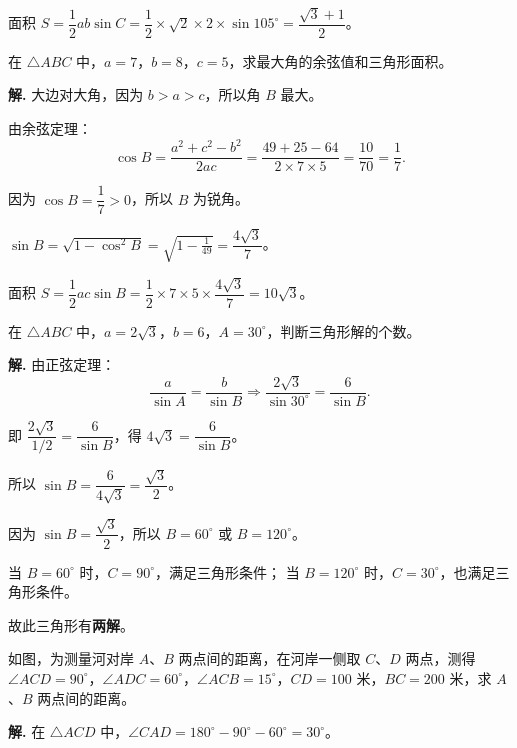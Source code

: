 \documentclass[11pt]{ctexrep}
\begin{document}
面积 $S = \dfrac{1}{2}ab\sin C = \dfrac{1}{2} \times \sqrt{2} \times 2 \times \sin 105^{\circ} = \dfrac{\sqrt{3} + 1}{2}$。

\begin{example}[余弦定理的应用]
    在 $\triangle ABC$ 中，$a = 7$，$b = 8$，$c = 5$，求最大角的余弦值和三角形面积。
\end{example}

\textbf{解.} 大边对大角，因为 $b > a > c$，所以角 $B$ 最大。

由余弦定理：
\[
    \cos B = \frac{a^2 + c^2 - b^2}{2ac} = \frac{49 + 25 - 64}{2 \times 7 \times 5} = \frac{10}{70} = \frac{1}{7}.
\]

因为 $\cos B = \dfrac{1}{7} > 0$，所以 $B$ 为锐角。

$\sin B = \sqrt{1 - \cos^2 B} = \sqrt{1 - \frac{1}{49}} = \dfrac{4\sqrt{3}}{7}$。

面积 $S = \dfrac{1}{2}ac\sin B = \dfrac{1}{2} \times 7 \times 5 \times \dfrac{4\sqrt{3}}{7} = 10\sqrt{3}$。

\begin{example}
    在 $\triangle ABC$ 中，$a = 2\sqrt{3}$，$b = 6$，$A = 30^{\circ}$，判断三角形解的个数。
\end{example}

\textbf{解.} 由正弦定理：
\[
    \frac{a}{\sin A} = \frac{b}{\sin B} \Rightarrow \frac{2\sqrt{3}}{\sin 30^{\circ}} = \frac{6}{\sin B}.
\]

即 $\dfrac{2\sqrt{3}}{1/2} = \dfrac{6}{\sin B}$，得 $4\sqrt{3} = \dfrac{6}{\sin B}$。

所以 $\sin B = \dfrac{6}{4\sqrt{3}} = \dfrac{\sqrt{3}}{2}$。

因为 $\sin B = \dfrac{\sqrt{3}}{2}$，所以 $B = 60^{\circ}$ 或 $B = 120^{\circ}$。

当 $B = 60^{\circ}$ 时，$C = 90^{\circ}$，满足三角形条件；
当 $B = 120^{\circ}$ 时，$C = 30^{\circ}$，也满足三角形条件。

故此三角形有\textbf{两解}。

\begin{realexam}[2026 奉贤高三二模]
    如图，为测量河对岸 $A$、$B$ 两点间的距离，在河岸一侧取 $C$、$D$ 两点，测得 $\angle ACD = 90^{\circ}$，$\angle ADC = 60^{\circ}$，$\angle ACB = 15^{\circ}$，$CD = 100$ 米，$BC = 200$ 米，求 $A$、$B$ 两点间的距离。
\end{realexam}

\textbf{解.} 在 $\triangle ACD$ 中，$\angle CAD = 180^{\circ} - 90^{\circ} - 60^{\circ} = 30^{\circ}$。
\end{document}

